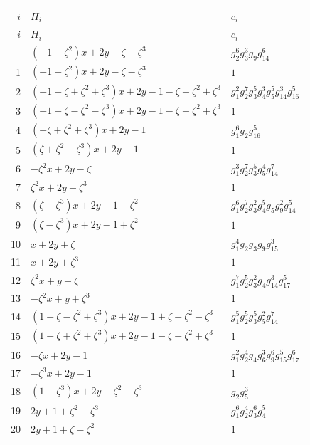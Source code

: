 \documentclass[11pt]{article}
\begin{document}
{\footnotesize\setlength{\tabcolsep}{4pt}\setlength{\LTpre}{3pt}\setlength{\LTpost}{3pt}\renewcommand{\arraystretch}{1.05}
\begin{longtable}{@{}rll@{}}
\toprule $i$ & $H_i$ & $c_i$\\\midrule\endfirsthead
\toprule $i$ & $H_i$ & $c_i$\\\midrule\endhead\bottomrule\endfoot
0 & $(-1-\zeta^2)x+2 y-\zeta-\zeta^3$ & $g_{2}^{6}g_{3}^{3}g_{9}g_{14}^{6}$\\
1 & $(-1+\zeta^2)x+2 y-\zeta-\zeta^3$ & $1$\\
2 & $(-1+\zeta+\zeta^2+\zeta^3)x+2 y-1-\zeta+\zeta^2+\zeta^3$ & $g_{1}^{2}g_{2}^{7}g_{3}^{5}g_{4}^{3}g_{5}^{5}g_{14}^{3}g_{16}^{5}$\\
3 & $(-1-\zeta-\zeta^2-\zeta^3)x+2 y-1-\zeta-\zeta^2+\zeta^3$ & $1$\\
4 & $(-\zeta+\zeta^2+\zeta^3)x+2 y-1$ & $g_{1}^{6}g_{2}g_{16}^{5}$\\
5 & $(\zeta+\zeta^2-\zeta^3)x+2 y-1$ & $1$\\
6 & $-\zeta^2 x+2 y-\zeta$ & $g_{1}^{3}g_{2}^{7}g_{3}^{5}g_{5}^{4}g_{14}^{7}$\\
7 & $\zeta^2 x+2 y+\zeta^3$ & $1$\\
8 & $(\zeta-\zeta^3)x+2 y-1-\zeta^2$ & $g_{1}^{6}g_{2}^{7}g_{3}^{2}g_{4}^{5}g_{5}g_{9}^{2}g_{14}^{5}$\\
9 & $(\zeta-\zeta^3)x+2 y-1+\zeta^2$ & $1$\\
10 & $x+2 y+\zeta$ & $g_{1}^{4}g_{2}g_{3}g_{9}g_{15}^{3}$\\
11 & $x+2 y+\zeta^3$ & $1$\\
12 & $\zeta^2 x+y-\zeta$ & $g_{1}^{7}g_{2}^{5}g_{3}^{2}g_{4}g_{14}^{3}g_{17}^{5}$\\
13 & $-\zeta^2 x+y+\zeta^3$ & $1$\\
14 & $(1+\zeta-\zeta^2+\zeta^3)x+2 y-1+\zeta+\zeta^2-\zeta^3$ & $g_{1}^{5}g_{2}^{5}g_{3}^{5}g_{5}^{2}g_{14}^{7}$\\
15 & $(1+\zeta+\zeta^2+\zeta^3)x+2 y-1-\zeta-\zeta^2+\zeta^3$ & $1$\\
16 & $-\zeta x+2 y-1$ & $g_{1}^{2}g_{2}^{4}g_{4}g_{6}^{3}g_{9}^{6}g_{15}^{5}g_{17}^{6}$\\
17 & $-\zeta^3 x+2 y-1$ & $1$\\
18 & $(1-\zeta^3)x+2 y-\zeta^2-\zeta^3$ & $g_{2}g_{5}^{3}$\\
19 & $2 y+1+\zeta^2-\zeta^3$ & $g_{1}^{6}g_{2}^{4}g_{3}^{6}g_{4}^{5}$\\
20 & $2 y+1+\zeta-\zeta^2$ & $1$\\

\end{longtable}}
\end{document}
